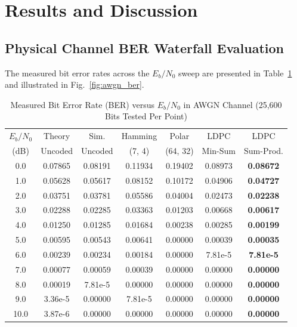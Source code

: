 \documentclass[conference]{IEEEtran}
\begin{document}
\section{Results and Discussion}

\subsection{Physical Channel BER Waterfall Evaluation}
The measured bit error rates across the $E_b/N_0$ sweep are presented in Table~\ref{tab:ber_results} and illustrated in Fig.~\ref{fig:awgn_ber}.

\begin{table}[htbp]
\caption{Measured Bit Error Rate (BER) versus $E_b/N_0$ in AWGN Channel (25,600 Bits Tested Per Point)}
\label{tab:ber_results}
\centering
\scriptsize
\begin{tabular}{ccccccc}
\toprule
$E_b/N_0$ & Theory & Sim. & Hamming & Polar & LDPC & LDPC \\
(dB) & Uncoded & Uncoded & (7, 4) & (64, 32) & Min-Sum & Sum-Prod. \\
\midrule
0.0 & 0.07865 & 0.08191 & 0.11934 & 0.19402 & 0.08973 & \textbf{0.08672} \\
1.0 & 0.05628 & 0.05617 & 0.08152 & 0.10172 & 0.04906 & \textbf{0.04727} \\
2.0 & 0.03751 & 0.03781 & 0.05586 & 0.04004 & 0.02473 & \textbf{0.02238} \\
3.0 & 0.02288 & 0.02285 & 0.03363 & 0.01203 & 0.00668 & \textbf{0.00617} \\
4.0 & 0.01250 & 0.01285 & 0.01684 & 0.00238 & 0.00285 & \textbf{0.00199} \\
5.0 & 0.00595 & 0.00543 & 0.00641 & 0.00000 & 0.00039 & \textbf{0.00035} \\
6.0 & 0.00239 & 0.00234 & 0.00184 & 0.00000 & 7.81e-5 & \textbf{7.81e-5} \\
7.0 & 0.00077 & 0.00059 & 0.00039 & 0.00000 & 0.00000 & \textbf{0.00000} \\
8.0 & 0.00019 & 7.81e-5 & 0.00000 & 0.00000 & 0.00000 & \textbf{0.00000} \\
9.0 & 3.36e-5 & 0.00000 & 7.81e-5 & 0.00000 & 0.00000 & \textbf{0.00000} \\
10.0 & 3.87e-6 & 0.00000 & 0.00000 & 0.00000 & 0.00000 & \textbf{0.00000} \\
\bottomrule
\end{tabular}
\end{table}
\end{document}
